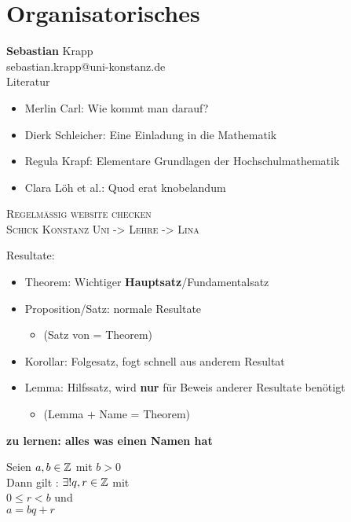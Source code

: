 \documentclass[consecutivenumbering]{gadsescript}
\begin{document}
\maketitle

\section*{Organisatorisches}
\textbf{Sebastian} Krapp\\
sebastian.krapp@uni-konstanz.de\\

Literatur
\begin{itemize}
	\item Merlin Carl: Wie kommt man darauf?
	\item Dierk Schleicher: Eine Einladung in die Mathematik
	\item Regula Krapf: Elementare Grundlagen der Hochschulmathematik
	\item Clara Löh et al.: Quod erat knobelandum
\end{itemize}

{\color{red}\scshape
\noindent Regelmäßig website checken\\
Schick Konstanz Uni -> Lehre -> Lina
}

Resultate:
\begin{itemize}
	\item Theorem: Wichtiger \textbf{Hauptsatz}/Fundamentalsatz
	\item Proposition/Satz: normale Resultate
		\begin{itemize}
			\item (Satz von = Theorem)
		\end{itemize}
	\item Korollar: Folgesatz, fogt schnell aus anderem Resultat
	\item Lemma: Hilfssatz, wird \textbf{nur} für Beweis anderer Resultate benötigt
		\begin{itemize}
			\item (Lemma + Name = Theorem)
		\end{itemize}
\end{itemize}
\textbf{zu lernen: alles was einen Namen hat}

\begin{task}
	Seien $ a, b \in \mathbb{Z} $ mit $ b > 0 $\\
	Dann gilt : $ \exists! q, r \in \mathbb{Z} $ mit\\
	$ 0 \leq r < b $ und\\
	$ a = bq + r $
\end{task}
\end{document}
